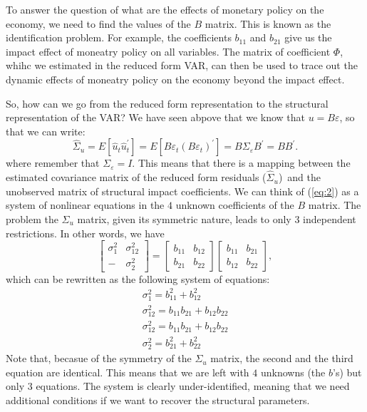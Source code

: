 \documentclass[10pt]{article}
\begin{document}
To answer the question of what are the effects of monetary policy on the
economy, we need to find the values of the $B$ matrix. This is known as the
identification problem. For example, the coefficients $b_{11}$ and $b_{21}$
give us the impact effect of moneatry policy on all variables. The matrix of
coefficient $\Phi $, whihc we estimated in the reduced form VAR, can then be
used to trace out the dynamic effects of moneatry policy on the economy
beyond the impact effect.

So, how can we go from the reduced form representation to the structural
representation of the VAR? We have seen abpove that we know that $%
u=B\varepsilon $, so that we can write:%
\begin{equation}
\hat{\Sigma}_{u}=E\left[ \hat{u}_{t}\hat{u}_{t}^{\prime }\right] =E\left[
B\varepsilon _{t}\left( B\varepsilon _{t}\right) ^{\prime }\right] =B\Sigma
_{\varepsilon }B^{\prime }=BB^{\prime }.  \label{eq:red2struct_1}
\end{equation}%
where remember that $\Sigma _{\varepsilon }=I$. This means that there is a
mapping between the estimated covariance matrix of the reduced form
residuals ($\hat{\Sigma}_{u}$)\ and the unobserved matrix of structural
impact coefficients. We can think of (\ref{eq:2}) as a system of nonlinear
equations in the $4$ unknown coefficients of the $B$ matrix. The problem the 
$\Sigma _{u}$ matrix, given its symmetric nature, leads to only $3$
independent restrictions. In other words, we have 
\begin{equation}
\left[ 
\begin{array}{cc}
\sigma _{1}^{2} & \sigma _{12}^{2} \\ 
- & \sigma _{2}^{2}%
\end{array}%
\right] =\left[ 
\begin{array}{cc}
b_{11} & b_{12} \\ 
b_{21} & b_{22}%
\end{array}%
\right] \left[ 
\begin{array}{cc}
b_{11} & b_{21} \\ 
b_{12} & b_{22}%
\end{array}%
\right] ,  \label{eq:red2struct_2}
\end{equation}%
which can be rewritten as the following system of equations:%
\begin{equation}
\begin{array}{l}
\sigma _{1}^{2}=b_{11}^{2}+b_{12}^{2} \\ 
\sigma _{12}^{2}=b_{11}b_{21}+b_{12}b_{22} \\ 
\sigma _{12}^{2}=b_{11}b_{21}+b_{12}b_{22} \\ 
\sigma _{2}^{2}=b_{21}^{2}+b_{22}^{2}%
\end{array}
\label{eq:red2struct_3}
\end{equation}%
Note that, becasue of the symmetry of the $\Sigma _{u}$ matrix, the second
and the third equation are identical. This means that we are left with $4$
unknowns (the $b$'s) but only $3$ equations. The system is clearly
under-identified, meaning that we need additional conditions if we want to
recover the structural parameters. 
\end{document}

